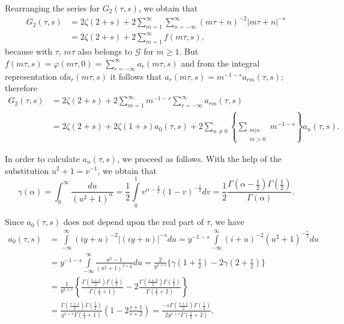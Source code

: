 Rearranging the series for $G_2(\tau, s)$, we obtain that 
\begin{align*}
G_2(\tau, s) & = 2\zeta(2+s) + 2 \sum^{\infty}_{m=1}
\sum^{\infty}_{n=-\infty} (m\tau+n)^{-2} |m\tau+n|^{-s}\\
& =  2\zeta(2+s) + 2 \sum^{\infty}_{m=1} f(m\tau,s),
\end{align*}
because with $\tau$, $m\tau$ also belongs to $\mathscr{G}$ for $m\geq
1$. But $f(m\tau, s)=\varphi(m\tau, 0)
=\sum\limits^{\infty}_{r=-\infty} a_r(m\tau,s)$ and from the integral
representation of\break $a_r(m\tau, s)$ it follows that $a_r(m\tau,
s)=m^{-1-s}a_{rm}(\tau,s)$; therefore
\begin{align*}
G_2 (\tau, s) & = 2\zeta(2+s) + 2 \sum^{\infty}_{m=1} m^{-1-s}
\sum^{\infty}_{r=-\infty} a_{rm}(\tau, s)\\
& = 2\zeta(2+s) + 2\zeta (1+s) a_0(\tau,s) + 2 \sum_{n\neq 0}
\left\{\sum_{\substack{m|n\\m>0}} m^{-1-s} \right\} a_n(\tau,s). 
\end{align*}

In order to calculate $a_n(\tau,s)$, we proceed as follows. With the
help of the \pageoriginale substitution $u^2+1=v^{-1}$, we obtain that
$$
\gamma(\alpha) = \int^{\infty}_0 \frac{du}{(u^2+1)^{\alpha}}
=\frac{1}{2} \int\limits^1_0 v^{\alpha-\frac{3}{2}}
(1-v)^{-\frac{1}{2}} dv = \frac{1}{2}
\frac{\Gamma\left(\alpha-\frac{1}{2}\right)
  \Gamma\left(\frac{1}{2}\right)}{\Gamma(\alpha)}. 
$$

Since $a_0(\tau,s)$ does not depend upon the real part of $\tau$, we
have 
\begin{align*}
a_0 (\tau, s) & = \int\limits^{\infty}_{-\infty} (iy+u)^{-2}
|(iy+u)|^{-s} du = y^{-1-s} \int\limits^{\infty}_{-\infty} (i+u)^{-2}
(u^2+1)^{-\frac{s}{2}}du\\
& = y^{-1-s} \int\limits^{\infty}_{-\infty}
\frac{u^2-1}{(u^2+1)^{2+\frac{s}{2}}} du = \frac{2}{y^{1+s}} \{\gamma
(1+\frac{s}{2}) -2\gamma(2+\frac{s}{2})\}\\
& = \frac{1}{y^{1+s}}
\left\{\frac{\Gamma(\frac{s+1}{2})\Gamma(\frac{1}{2})}{\Gamma(\frac{s}{2}+1)}
- 2 \frac{\Gamma(\frac{s+3}{2}) \Gamma
  (\frac{1}{2})}{\Gamma(\frac{s}{2}+2)} 
\right\} \\
& = \frac{\Gamma(\frac{s+1}{2}) \Gamma
  (\frac{1}{2})}{y^{1+s}\Gamma(\frac{s}{2}+1)}
\left(1-2\frac{s+1}{s+2}\right)
=\frac{-s\Gamma(\frac{s+1}{2}) \Gamma
  (\frac{1}{2})}{2y^{1+s}\Gamma(\frac{s}{2}+2)}. 
\end{align*}


